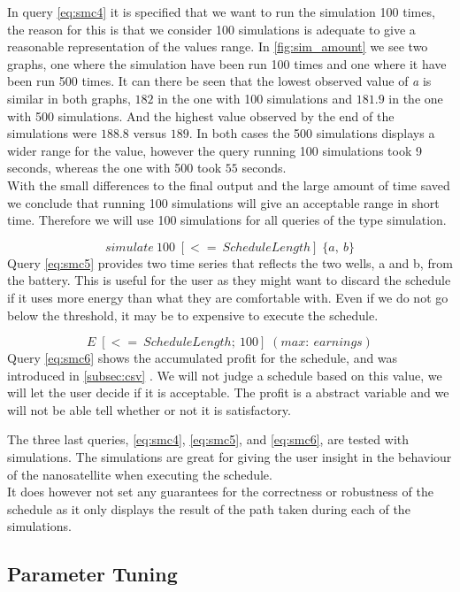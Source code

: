 In query \ref{eq:smc4} it is specified that we want to run the simulation 100 times, the reason for this is that we consider 100 simulations is adequate to give a reasonable representation of the values range. In \cref{fig:sim_amount} we see two graphs, one where the simulation have been run 100 times and one where it have been run 500 times. It can there be seen that the lowest observed value of \textit{a} is similar in both graphs, $182$ in the one with 100 simulations and $181.9$ in the one with 500 simulations. And the highest value observed by the end of the simulations were $188.8$ versus $189$. In both cases the 500 simulations displays a wider range for the value, however the query running 100 simulations took 9 seconds, whereas the one with 500 took $55$ seconds.\\
With the small differences to the final output and the large amount of time saved we conclude that running 100 simulations will give an acceptable range in short time. Therefore we will use 100 simulations for all queries of the type simulation.

\begin{equation} \label{eq:smc5}
	simulate\ 100 \; [<=\ ScheduleLength]\; \{ a,\ b\}
\end{equation}
Query \ref{eq:smc5} provides two time series that reflects the two wells, a and b, from the battery. This is useful for the user as they might want to discard the schedule if it uses more energy than what they are comfortable with. Even if we do not go below the threshold, it may be to expensive to execute the schedule. %

\begin{equation} \label{eq:smc6}
	E \; [<=\ ScheduleLength;\ 100]\; ( max:\ earnings)
\end{equation}
Query \ref{eq:smc6} shows the accumulated profit for the schedule, and was introduced in \cref{subsec:csv} . We will not judge a schedule based on this value, we will let the user decide if it is acceptable. The profit is a abstract variable and we will not be able tell whether or not it is satisfactory.


The three last queries, \ref{eq:smc4}, \ref{eq:smc5}, and \ref{eq:smc6}, are tested with simulations. The simulations are great for giving the user insight in the behaviour of the nanosatellite when executing the schedule. \\
It does however not set any guarantees for the correctness or robustness of the schedule as it only displays the result of the path taken during each of the simulations.


\subsection{Parameter Tuning}
